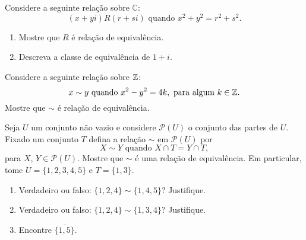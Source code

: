\documentclass[12pt]{exam}
\begin{document}
    \vspace{.3cm}



    \vspace{.3cm}

    \questao{} Considere a seguinte rela{\c c}{\~a}o sobre $\mathbb{C}$:
    \[
        (x+yi) R (r+si) \mbox{ quando } x^2+y^2=r^2+s^2.
    \]
    \begin{enumerate}[label={\alph*})]
        \item Mostre que $R$ {\'e} rela{\c c}{\~a}o de equival{\^e}ncia.

        \item Descreva a classe de equival{\^e}ncia de $1+i$.
    \end{enumerate}

    \vspace{.3cm}

    \questao{} Considere a seguinte rela\c{c}\~ao sobre $\mathbb{Z}$:
    \[
        x \sim y \mbox{ quando }  x^2 - y^2 = 4k, \mbox{ para algum } k \in \mathbb{Z}.
    \]
    Mostre que $\sim$ {\'e} rela{\c c}{\~a}o de equival{\^e}ncia.

    \vspace{.3cm}

    \questao{} Seja $U$ um conjunto não vazio e considere $\mathcal{P}(U)$ o conjunto das partes de $U$. Fixado um conjunto $T$ defina a relação $\sim$ em $\mathcal{P}(U)$ por
    \[
        X \sim Y \mbox{ quando } X \cap T = Y \cap T,
    \]
    para $X$, $Y \in \mathcal{P}(U)$. Mostre que $\sim$ é uma relação de equivalência. Em particular, tome $U = \{1,2,3,4,5\}$ e $T = \{1,3\}$.
    \begin{enumerate}[label={\alph*})]
        \item Verdadeiro ou falso: $\{1,2,4\} \sim \{1,4,5\}$? Justifique.

        \item Verdadeiro ou falso: $\{1,2,4\} \sim \{1,3,4\}$? Justifique.

        \item Encontre $\overline{\{1,5\}}$.

    \end{enumerate}

    \vspace{.3cm}
\end{document}
